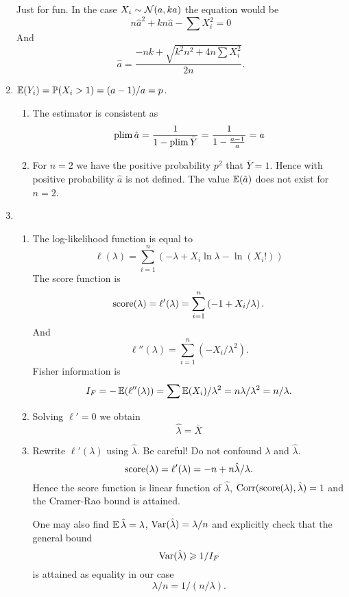 \begin{enumerate}
Just for fun. 
In the case $X_i \sim \mathcal{N}(a, ka)$ the equation would be
\[
    n\hat a^2 + k n\hat a - \sum X_i^2  = 0    
\]
And 
\[
\hat a = \frac{-nk + \sqrt{k^2 n^2  + 4n \sum X_i^2}}{2n}.    
\]



\item $\operatorname{\mathbb{E}}(Y_i) = \operatorname{\mathbb{P}}(X_i > 1) = (a-1) / a = p$.
\begin{enumerate}
    \item The estimator is consistent as
\[
\operatorname*{plim} \hat a = \frac {1}{1- \operatorname*{plim} \bar Y } = \frac{1}{1 - \frac{a-1}{a}} = a
\]
\item 
For $n=2$ we have the positive probability $p^2$ that $\bar Y = 1$.
Hence with positive probability $\hat a$ is not defined.
The value $\operatorname{\mathbb{E}}(\hat a)$ does not exist for $n=2$.
\end{enumerate}

\item 
\begin{enumerate}
\item The log-likelihood function is equal to
\[
\ell(\lambda) = \sum_{i=1}^n \left( -\lambda + X_i \ln \lambda - \ln (X_i!)\right)    
\]
The score function is 
\[
\mathrm{score}(\lambda) = \ell'(\lambda) = \sum_{i=1}^n \left( -1 + X_i / \lambda\right).
\]
And
\[
\ell''(\lambda) = \sum_{i=1}^n \left(- X_i / \lambda^2 \right).
\]
Fisher information is 
\[
I_F = -\operatorname{\mathbb{E}}(\ell''(\lambda)) = \sum \operatorname{\mathbb{E}}(X_i) / \lambda^2 = n\lambda / \lambda^2 = n/\lambda.    
\]

\item Solving $\ell' = 0$ we obtain 
\[
\hat \lambda = \bar X    
\] 

\item Rewrite $\ell'(\lambda)$ using $\hat\lambda$. 
Be careful! Do not confound $\lambda$ and $\hat\lambda$. 
\[
\mathrm{score}(\lambda) = \ell'(\lambda) = -n + n \hat \lambda / \lambda.
\]
Hence the score function is linear function of $\hat\lambda$, $\operatorname{Corr}(\mathrm{score}(\lambda), \hat\lambda) = 1$
and the Cramer-Rao bound is attained. 

One may also  find $\operatorname{\mathbb{E}} \hat \lambda = \lambda$, $\operatorname{Var}(\hat \lambda) = \lambda / n$ and
explicitly check that the general bound
\[
\operatorname{Var}(\hat \lambda) \geqslant 1/ I_F 
\]
is attained as equality in our case
\[
    \lambda / n = 1/(n/\lambda). 
\]


\end{enumerate}


\end{enumerate}
